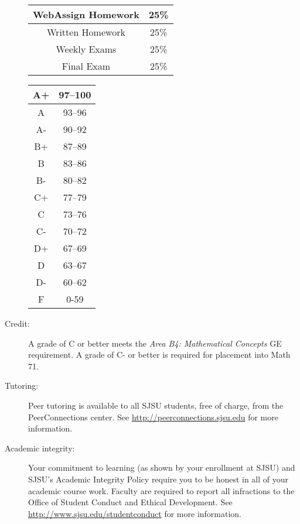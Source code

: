 \documentclass[letterpaper,12pt,fleqn]{article}
\begin{document}
\begin{description}
  \begin{minipage}{3in}
    \begin{tabular}{|c|c|}
      \hline
      WebAssign Homework & 25\% \\
      \hline
      Written Homework & 25\% \\
      \hline
      Weekly Exams & 25\% \\
      \hline
      Final Exam & 25\% \\
      \hline
    \end{tabular}
  \end{minipage}
  \begin{minipage}{3in}
    \begin{tabular}{|c|c|}
      \hline
      A+ & 97--100 \\
      \hline
      A & 93--96 \\
      \hline
      A- & 90--92 \\
      \hline
      B+ & 87--89 \\
      \hline
      B & 83--86 \\
      \hline
      B- & 80--82 \\
      \hline
      C+ & 77--79 \\
      \hline
      C & 73--76 \\
      \hline
      C- & 70--72 \\
      \hline
      D+ & 67--69 \\
      \hline
      D & 63--67 \\
      \hline
      D- & 60--62 \\
      \hline
      F & 0-59 \\
      \hline
    \end{tabular}
  \end{minipage}
  
\item[Credit:] A grade of C or better meets the \emph{Area B4: Mathematical
    Concepts} GE requirement. A grade of C- or better is required for placement
    into Math 71.

\item[Tutoring:] Peer tutoring is available to all SJSU students, free of
    charge, from the PeerConnections center. See
    \url{http://peerconnections.sjsu.edu} for more information.

\item[Academic integrity:] Your commitment to learning (as shown by your
    enrollment at SJSU) and SJSU's Academic Integrity Policy require you to be
    honest in all of your academic course work.  Faculty are required to report
    all infractions to the Office of Student Conduct and Ethical Development.
    See \url{http://www.sjsu.edu/studentconduct} for more information.


\end{description}
\end{document}
